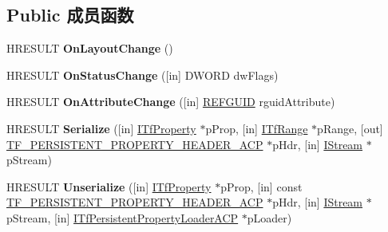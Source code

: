 \subsection*{Public 成员函数}
\begin{DoxyCompactItemize}
\item 
\mbox{\label{interface_i_tf_context_owner_services_aeeae74fed75a8932b0d21660ffbb570a}} 
H\+R\+E\+S\+U\+LT {\bfseries On\+Layout\+Change} ()
\item 
\mbox{\label{interface_i_tf_context_owner_services_a64701c877d212f434a90a3307171404a}} 
H\+R\+E\+S\+U\+LT {\bfseries On\+Status\+Change} (\mbox{[}in\mbox{]} D\+W\+O\+RD dw\+Flags)
\item 
\mbox{\label{interface_i_tf_context_owner_services_ab725ac9f60c9014cd99f6f0ddc4591f8}} 
H\+R\+E\+S\+U\+LT {\bfseries On\+Attribute\+Change} (\mbox{[}in\mbox{]} \hyperlink{struct___g_u_i_d}{R\+E\+F\+G\+U\+ID} rguid\+Attribute)
\item 
\mbox{\label{interface_i_tf_context_owner_services_ad37995012e5c50d01e1b1e600c1f2236}} 
H\+R\+E\+S\+U\+LT {\bfseries Serialize} (\mbox{[}in\mbox{]} \hyperlink{interface_i_tf_property}{I\+Tf\+Property} $\ast$p\+Prop, \mbox{[}in\mbox{]} \hyperlink{interface_i_tf_range}{I\+Tf\+Range} $\ast$p\+Range, \mbox{[}out\mbox{]} \hyperlink{struct_t_f___p_e_r_s_i_s_t_e_n_t___p_r_o_p_e_r_t_y___h_e_a_d_e_r___a_c_p}{T\+F\+\_\+\+P\+E\+R\+S\+I\+S\+T\+E\+N\+T\+\_\+\+P\+R\+O\+P\+E\+R\+T\+Y\+\_\+\+H\+E\+A\+D\+E\+R\+\_\+\+A\+CP} $\ast$p\+Hdr, \mbox{[}in\mbox{]} \hyperlink{interface_i_stream}{I\+Stream} $\ast$p\+Stream)
\item 
\mbox{\label{interface_i_tf_context_owner_services_afd83c259bbb2e4793cdbdd967b57c251}} 
H\+R\+E\+S\+U\+LT {\bfseries Unserialize} (\mbox{[}in\mbox{]} \hyperlink{interface_i_tf_property}{I\+Tf\+Property} $\ast$p\+Prop, \mbox{[}in\mbox{]} const \hyperlink{struct_t_f___p_e_r_s_i_s_t_e_n_t___p_r_o_p_e_r_t_y___h_e_a_d_e_r___a_c_p}{T\+F\+\_\+\+P\+E\+R\+S\+I\+S\+T\+E\+N\+T\+\_\+\+P\+R\+O\+P\+E\+R\+T\+Y\+\_\+\+H\+E\+A\+D\+E\+R\+\_\+\+A\+CP} $\ast$p\+Hdr, \mbox{[}in\mbox{]} \hyperlink{interface_i_stream}{I\+Stream} $\ast$p\+Stream, \mbox{[}in\mbox{]} \hyperlink{interface_i_tf_persistent_property_loader_a_c_p}{I\+Tf\+Persistent\+Property\+Loader\+A\+CP} $\ast$p\+Loader)

\end{DoxyCompactItemize}
